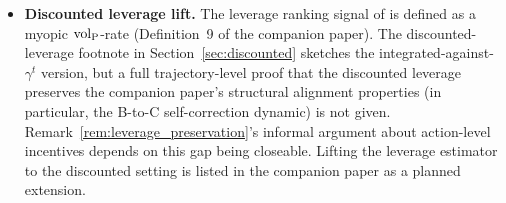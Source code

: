\begin{itemize}
\item \textbf{Discounted leverage lift.} The leverage ranking signal of
  \citet{lasser2026poset} is defined as a myopic ${\operatorname{vol}_{\mathrm{P}}}$-rate
  (Definition~9 of the companion paper). The
  discounted-leverage footnote in
  Section~\ref{sec:discounted} sketches the integrated-against-$\gamma^t$
  version, but a full trajectory-level proof that the
  discounted leverage preserves the companion paper's structural
  alignment properties (in particular, the B-to-C self-correction
  dynamic) is not given. Remark~\ref{rem:leverage_preservation}'s
  informal argument about action-level incentives depends on this gap
  being closeable. Lifting the leverage estimator to the discounted
  setting is listed in the companion paper as a planned extension.
\end{itemize}
